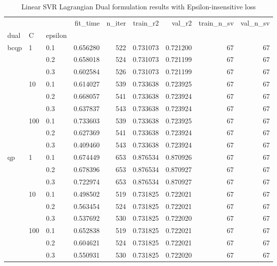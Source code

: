 \begin{table}[h!]
\centering
\caption{Linear SVR Lagrangian Dual formulation results with Epsilon-insensitive loss}
\label{linear_lagrangian_dual_svr_cv_results}
\begin{tabular}{lllrrrrrr}
\toprule
   &     &     &  fit\_time &  n\_iter &  train\_r2 &    val\_r2 &  train\_n\_sv &  val\_n\_sv \\
dual & C & epsilon &           &         &           &           &             &           \\
\midrule
bcqp & 1   & 0.1 &  0.656280 &     522 &  0.731073 &  0.721200 &          67 &        67 \\
   &     & 0.2 &  0.658018 &     524 &  0.731073 &  0.721199 &          67 &        67 \\
   &     & 0.3 &  0.602584 &     526 &  0.731073 &  0.721199 &          67 &        67 \\
   & 10  & 0.1 &  0.614027 &     539 &  0.733638 &  0.723925 &          67 &        67 \\
   &     & 0.2 &  0.668057 &     541 &  0.733638 &  0.723924 &          67 &        67 \\
   &     & 0.3 &  0.637837 &     543 &  0.733638 &  0.723924 &          67 &        67 \\
   & 100 & 0.1 &  0.733603 &     539 &  0.733638 &  0.723925 &          67 &        67 \\
   &     & 0.2 &  0.627369 &     541 &  0.733638 &  0.723924 &          67 &        67 \\
   &     & 0.3 &  0.409460 &     543 &  0.733638 &  0.723924 &          67 &        67 \\
qp & 1   & 0.1 &  0.674449 &     653 &  0.876534 &  0.870926 &          67 &        67 \\
   &     & 0.2 &  0.678396 &     653 &  0.876534 &  0.870927 &          67 &        67 \\
   &     & 0.3 &  0.722974 &     653 &  0.876534 &  0.870927 &          67 &        67 \\
   & 10  & 0.1 &  0.498502 &     519 &  0.731825 &  0.722021 &          67 &        67 \\
   &     & 0.2 &  0.563454 &     524 &  0.731825 &  0.722021 &          67 &        67 \\
   &     & 0.3 &  0.537692 &     530 &  0.731825 &  0.722020 &          67 &        67 \\
   & 100 & 0.1 &  0.652838 &     519 &  0.731825 &  0.722021 &          67 &        67 \\
   &     & 0.2 &  0.604621 &     524 &  0.731825 &  0.722021 &          67 &        67 \\
   &     & 0.3 &  0.550931 &     530 &  0.731825 &  0.722020 &          67 &        67 \\
\bottomrule
\end{tabular}
\end{table}
